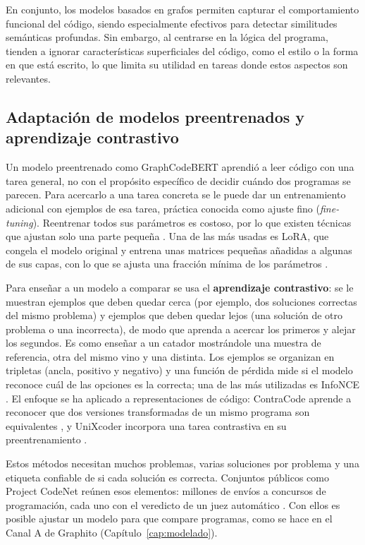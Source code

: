 En conjunto, los modelos basados en grafos permiten capturar el comportamiento funcional del código, siendo especialmente efectivos para detectar similitudes semánticas profundas. Sin embargo, al centrarse en la lógica del programa, tienden a ignorar características superficiales del código, como el estilo o la forma en que está escrito, lo que limita su utilidad en tareas donde estos aspectos son relevantes.

\subsection{Adaptación de modelos preentrenados y aprendizaje contrastivo}
\label{sec:aprendizaje_contrastivo}

Un modelo preentrenado como GraphCodeBERT aprendió a leer código con una tarea general, no con el propósito específico de decidir cuándo dos programas se parecen. Para acercarlo a una tarea concreta se le puede dar un entrenamiento adicional con ejemplos de esa tarea, práctica conocida como ajuste fino (\textit{fine-tuning}). Reentrenar todos sus parámetros es costoso, por lo que existen técnicas que ajustan solo una parte pequeña \cite{Ding2023PEFT}. Una de las más usadas es LoRA, que congela el modelo original y entrena unas matrices pequeñas añadidas a algunas de sus capas, con lo que se ajusta una fracción mínima de los parámetros \cite{Hu2022LoRA}.

Para enseñar a un modelo a comparar se usa el \textbf{aprendizaje contrastivo}: se le muestran ejemplos que deben quedar cerca (por ejemplo, dos soluciones correctas del mismo problema) y ejemplos que deben quedar lejos (una solución de otro problema o una incorrecta), de modo que aprenda a acercar los primeros y alejar los segundos. Es como enseñar a un catador mostrándole una muestra de referencia, otra del mismo vino y una distinta. Los ejemplos se organizan en tripletas (ancla, positivo y negativo) \cite{Schroff2015FaceNet} y una función de pérdida mide si el modelo reconoce cuál de las opciones es la correcta; una de las más utilizadas es InfoNCE \cite{Oord2018InfoNCE}. El enfoque se ha aplicado a representaciones de código: ContraCode aprende a reconocer que dos versiones transformadas de un mismo programa son equivalentes \cite{Jain2021ContraCode}, y UniXcoder incorpora una tarea contrastiva en su preentrenamiento \cite{Guo2022UniXcoder}.

Estos métodos necesitan muchos problemas, varias soluciones por problema y una etiqueta confiable de si cada solución es correcta. Conjuntos públicos como Project CodeNet reúnen esos elementos: millones de envíos a concursos de programación, cada uno con el veredicto de un juez automático \cite{Puri2021CodeNet}. Con ellos es posible ajustar un modelo para que compare programas, como se hace en el Canal A de Graphito (Capítulo~\ref{cap:modelado}).

